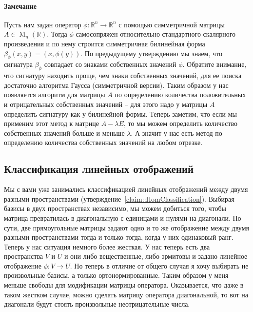 \paragraph{Замечание}

Пусть нам задан оператор $\phi\colon \mathbb R^n\to \mathbb R^n$ с помощью симметричной матрицы $A\in \operatorname{M}_n(\mathbb R)$.
Тогда $\phi$ самосопряжен относительно стандартного скалярного произведения и по нему строится симметричная билинейная форма $\beta_\phi(x, y) = (x, \phi (y))$.
По предыдущему утверждению мы знаем, что сигнатура $\beta_\phi$ совпадает со знаками собственных значений $\phi$.
Обратите внимание, что сигнатуру находить проще, чем знаки собственных значений, для ее поиска достаточно алгоритма Гаусса (симметричной версии).
Таким образом у нас появляется алгоритм для матрицы $A$ по определению количества положительных и отрицательных собственных значений -- для этого надо у матрицы $A$ определить сигнатуру как у билинейной формы.
Теперь заметим, что если мы применим этот метод к матрице $A - \lambda E$, то мы можем определить количество собственных значений больше и меньше $\lambda$.
А значит у нас есть метод по определению количества собственных значений на любом отрезке.


\subsection{Классификация линейных отображений}

Мы с вами уже занимались классификацией линейных отображений между двумя разными пространствами (утверждение~\ref{claim::HomClassification}).
Выбирая базисы в двух пространствах независимо, мы можем добиться того, чтобы матрица превратилась в диагональную с единицами и нулями на диагонали.
По сути, две прямоугольные матрицы задают одно и то же отображение между двумя разными пространствами тогда и только тогда, когда у них одинаковый ранг.
Теперь у нас ситуация немного более жесткая.
У нас теперь есть два пространства $V$ и $U$ и они либо вещественные, либо эрмитовы и задано линейное отображение $\phi\colon V\to U$.
Но теперь в отличие от общего случая я хочу выбирать не произвольные базисы, а только ортонормированные.
Таким образом у меня меньше свободы для модификации матрицы оператора.
Оказывается, что даже в таком жестком случае, можно сделать матрицу оператора диагональной, то вот на диагонали будут стоять произвольные неотрицательные числа.

